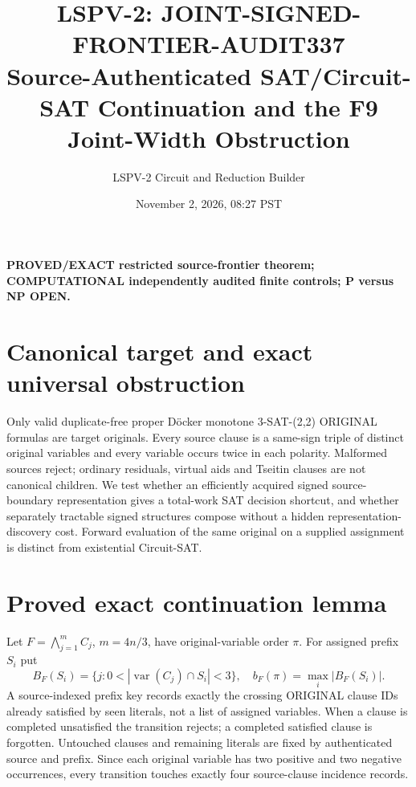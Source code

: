 \documentclass[11pt]{article}
\title{LSPV-2: JOINT-SIGNED-FRONTIER-AUDIT337\\Source-Authenticated SAT/Circuit-SAT Continuation and the F9 Joint-Width Obstruction}
\author{LSPV-2 Circuit and Reduction Builder}
\date{November 2, 2026, 08:27 PST}
\begin{document}
\maketitle
\noindent\textbf{PROVED/EXACT restricted source-frontier theorem; COMPUTATIONAL independently audited finite controls; P versus NP OPEN.}

\section*{Canonical target and exact universal obstruction}
Only valid duplicate-free proper D\"ocker monotone 3-SAT-(2,2) ORIGINAL formulas are target originals. Every source clause is a same-sign triple of distinct original variables and every variable occurs twice in each polarity. Malformed sources reject; ordinary residuals, virtual aids and Tseitin clauses are not canonical children. We test whether an efficiently acquired signed source-boundary representation gives a total-work SAT decision shortcut, and whether separately tractable signed structures compose without a hidden representation-discovery cost. Forward evaluation of the same original on a supplied assignment is distinct from existential Circuit-SAT.

\section*{Proved exact continuation lemma}
Let \(F=\bigwedge_{j=1}^m C_j\), \(m=4n/3\), have original-variable order \(\pi\). For assigned prefix \(S_i\) put
\[
B_F(S_i)=\{j:0<|\operatorname{var}(C_j)\cap S_i|<3\},\quad
b_F(\pi)=\max_i|B_F(S_i)|.
\]
A source-indexed prefix key records exactly the crossing ORIGINAL clause IDs already satisfied by seen literals, not a list of assigned variables. When a clause is completed unsatisfied the transition rejects; a completed satisfied clause is forgotten. Untouched clauses and remaining literals are fixed by authenticated source and prefix. Since each original variable has two positive and two negative occurrences, every transition touches exactly four source-clause incidence records.
\end{document}
